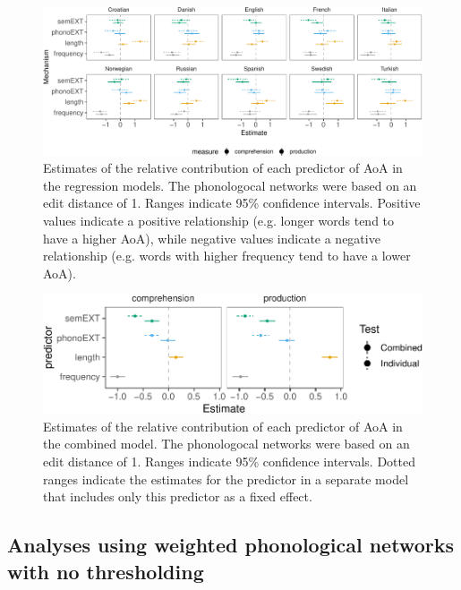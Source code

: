 \documentclass[english,,man,floatsintext]{apa6}
\begin{document}
\begin{figure}[!h]
\includegraphics[width=\textwidth]{ms_files/figure-latex/staticPredEdit1-1} \caption{Estimates of the relative contribution of each predictor of AoA in the regression models. The phonologocal networks were based on an edit distance of 1. Ranges indicate 95\% confidence intervals. Positive values indicate a positive relationship (e.g. longer words tend to have a higher AoA), while negative values indicate a negative relationship (e.g. words with higher frequency tend to have a lower AoA).}\label{fig:staticPredEdit1}
\end{figure}

\begin{figure}[!h]
\includegraphics[width=\textwidth]{ms_files/figure-latex/staticAllEdit-1} \caption{Estimates of the relative contribution of each predictor of AoA in the combined model. The phonologocal networks were based on an edit distance of 1. Ranges indicate 95\% confidence intervals. Dotted ranges indicate the estimates for the predictor in a separate model that includes only this predictor as a fixed effect.}\label{fig:staticAllEdit}
\end{figure}

\hypertarget{analyses-using-weighted-phonological-networks-with-no-thresholding}{%
\subsection{Analyses using weighted phonological networks with no thresholding}\label{analyses-using-weighted-phonological-networks-with-no-thresholding}}
\end{document}
